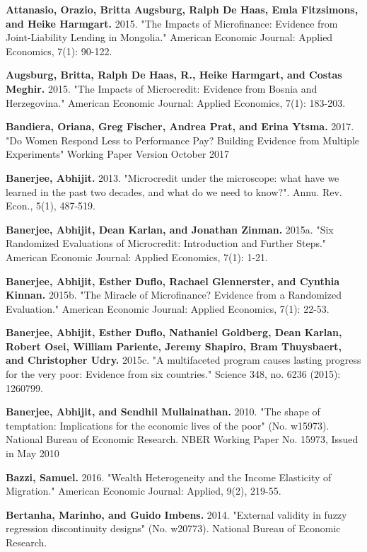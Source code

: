 \documentclass[AER]{AEA}
\begin{document}
\begin{thebibliography}{99}
 \textbf{ Attanasio, Orazio, Britta Augsburg, Ralph De Haas, Emla Fitzsimons, and Heike Harmgart.} 2015. "The Impacts of Microfinance: Evidence from Joint-Liability Lending in Mongolia." American Economic Journal: Applied Economics, 7(1): 90-122.

 \textbf{ Augsburg, Britta, Ralph De Haas, R., Heike Harmgart, and Costas Meghir.} 2015. "The Impacts of Microcredit: Evidence from Bosnia and Herzegovina." American Economic Journal: Applied Economics, 7(1): 183-203.

 \textbf{ Bandiera, Oriana, Greg Fischer, Andrea Prat, and Erina Ytsma.} 2017. "Do Women Respond Less to Performance Pay? Building Evidence from Multiple Experiments" Working Paper Version October 2017

 \textbf{ Banerjee, Abhijit.} 2013. "Microcredit under the microscope: what have we learned in the past two decades, and what do we need to know?". Annu. Rev. Econ., 5(1), 487-519.

 \textbf{ Banerjee, Abhijit, Dean Karlan, and Jonathan Zinman.} 2015a. "Six Randomized Evaluations of Microcredit: Introduction and Further Steps." American Economic Journal: Applied Economics, 7(1): 1-21.

 \textbf{ Banerjee, Abhijit, Esther Duflo, Rachael Glennerster, and Cynthia Kinnan.} 2015b. "The Miracle of Microfinance? Evidence from a Randomized Evaluation." American Economic Journal: Applied Economics, 7(1): 22-53.

 \textbf{ Banerjee, Abhijit, Esther Duflo, Nathaniel Goldberg, Dean Karlan, Robert Osei, William Pariente, Jeremy Shapiro, Bram Thuysbaert, and Christopher Udry.} 2015c. "A multifaceted program causes lasting progress for the very poor: Evidence from six countries." Science 348, no. 6236 (2015): 1260799.

 \textbf{ Banerjee, Abhijit, and Sendhil Mullainathan.} 2010. "The shape of temptation: Implications for the economic lives of the poor" (No. w15973). National Bureau of Economic Research. NBER Working Paper No. 15973, Issued in May 2010

 \textbf{ Bazzi, Samuel.} 2016. "Wealth Heterogeneity and the Income Elasticity of Migration." American Economic Journal: Applied, 9(2), 219-55.

 \textbf{ Bertanha, Marinho, and Guido Imbens.} 2014. "External validity in fuzzy regression discontinuity designs" (No. w20773). National Bureau of Economic Research.


\end{thebibliography}
\end{document}
